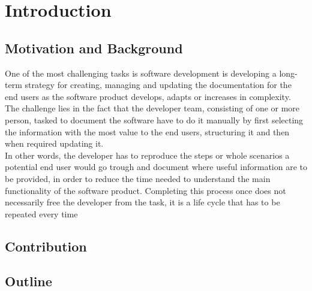 \chapter{Introduction}
\section{Motivation and Background}
One of the most challenging tasks is software development is developing a long-term strategy for creating, managing and updating the documentation for the end users as the software product develops, adapts or increases in complexity. The challenge lies in the fact that the developer team, consisting of one or more person, tasked to document the software have to do it manually by first selecting the information with the most value to the end users, structuring it and then when required updating it.\\
In other words, the developer has to reproduce the steps or whole scenarios a potential end user would go trough and document where useful information are to be provided, in order to reduce the time needed to understand the main functionality of the software product. Completing this process once does not necessarily free the developer from the task, it is a life cycle that has to be repeated every time 
\section{Contribution}
\section{Outline}